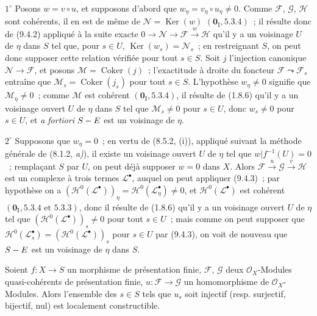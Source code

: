 $1^\circ$ Posons $w=v\circ u$, et supposons d'abord que
$w_\eta=v_\eta\circ u_\eta\neq0$. Comme $\mathcal F$, $\mathcal G$,
$\mathcal H$ sont cohérents, il en est de même de
$\mathcal N=\operatorname{Ker}(w)$ $(\mathbf 0_{\mathrm I},5.3.4)$~; il
résulte donc de (9.4.2) appliqué à la suite exacte
$0\to\mathcal N\to\mathcal F\xrightarrow{w}\mathcal H$ qu'il y a un
voisinage $U$ de $\eta$ dans $S$ tel que, pour $s\in U$,
$\operatorname{Ker}(w_s)=\mathcal N_s$~; en restreignant $S$, on peut donc
supposer cette relation vérifiée pour tout $s\in S$. Soit $j$ l'injection
canonique $\mathcal N\to\mathcal F$, et posons
$\mathcal M=\operatorname{Coker}(j)$~; l'exactitude à droite du foncteur
$\mathcal F\leadsto\mathcal F_s$ entraîne que
$\mathcal M_s=\operatorname{Coker}(j_s)$ pour tout $s\in S$. L'hypothèse
$w_\eta\neq0$ signifie que $\mathcal M_\eta\neq0$~; comme $\mathcal M$ est
cohérent $(\mathbf 0_{\mathrm I},5.3.4)$, il résulte de (1.8.6) qu'il y a un
voisinage ouvert $U$ de $\eta$ dans $S$ tel que $\mathcal M_s\neq0$ pour
$s\in U$, donc $w_s\neq0$ pour $s\in U$, et \emph{a fortiori} $S- E$ est un
voisinage de $\eta$.

$2^\circ$ Supposons que $w_\eta=0$~; en vertu de (8.5.2, (i)), appliqué
suivant la méthode générale de (8.1.2, \emph{a)}), il existe un voisinage
ouvert $U$ de $\eta$ tel que $w|f^{-1}(U)=0$~; remplaçant $S$ par $U$, on peut
déjà supposer $w=0$ dans $X$. Alors
$\mathcal F\xrightarrow{u}\mathcal G\xrightarrow{v}\mathcal H$ est un
complexe à trois termes $\mathcal L^\bullet$, auquel on peut appliquer
(9.4.3)~; par hypothèse on a
$(\mathcal H^0(\mathcal L^\bullet))_\eta=
\mathcal H^0(\mathcal L^\bullet_\eta)\neq0$, et
$\mathcal H^0(\mathcal L^\bullet)$ est cohérent
$(\mathbf 0_{\mathrm I},5.3.4\text{ et }5.3.3)$, donc il résulte de (1.8.6)
qu'il y a un voisinage ouvert $U$ de $\eta$ tel que
$(\mathcal H^0(\mathcal L^\bullet))_s\neq0$ pour tout $s\in U$~; mais comme
on peut supposer que
$\mathcal H^0(\mathcal L_s^\bullet)=(\mathcal H^0(\mathcal L^\bullet))_s$
pour $s\in U$ par (9.4.3), on voit de nouveau que $S- E$ est un voisinage de
$\eta$ dans $S$.


\begin{corollary}[9.4.5]
\label{IV.9.4.5-fr}
Soient $f:X\to S$ un morphisme de présentation finie, $\mathcal F$,
$\mathcal G$ deux $\mathcal O_X$-Modules quasi-cohérents de présentation finie,
$u:\mathcal F\to\mathcal G$ un homomorphisme de $\mathcal O_X$-Modules.
Alors l'ensemble des $s\in S$ tels que $u_s$ soit injectif
\textnormal{(resp.} surjectif, bijectif, nul\textnormal{)} est localement
constructible.
\end{corollary}

